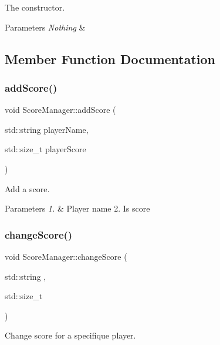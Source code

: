 The constructor. 


\begin{DoxyParams}{Parameters}
{\em Nothing} & \\
\hline
\end{DoxyParams}


\subsection{Member Function Documentation}
\mbox{\label{classScoreManager_a2597a2f7d0786295a6ee3445502a6d6f}} 
\subsubsection{\texorpdfstring{add\+Score()}{addScore()}}
{\footnotesize\ttfamily void Score\+Manager\+::add\+Score (\begin{DoxyParamCaption}\item[{std\+::string}]{player\+Name,  }\item[{std\+::size\+\_\+t}]{player\+Score }\end{DoxyParamCaption})}



Add a score. 


\begin{DoxyParams}{Parameters}
{\em 1.} & Player name 2. Is score \\
\hline
\end{DoxyParams}
\mbox{\label{classScoreManager_a16c1e33b2972b9609b6d568dc8b7a3b0}} 
\subsubsection{\texorpdfstring{change\+Score()}{changeScore()}}
{\footnotesize\ttfamily void Score\+Manager\+::change\+Score (\begin{DoxyParamCaption}\item[{std\+::string}]{,  }\item[{std\+::size\+\_\+t}]{ }\end{DoxyParamCaption})}



Change score for a specifique player. 


